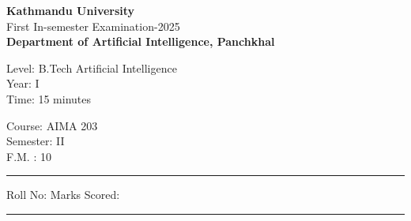 \documentclass[12pt]{exam}
\begin{document}
\begin{center}
  {\bfseries  {\large Kathmandu University}} \\
  First In-semester Examination-2025 \\[-2mm]
    \textbf{\small Department of Artificial Intelligence, Panchkhal}
\end{center}
\vspace{2mm}

\begin{minipage}{0.70\linewidth}
  \begin{flushleft}
    Level: B.Tech Artificial Intelligence \\
    Year: I \\
    Time: 15 minutes
  \end{flushleft}
\end{minipage} \hfill
\begin{minipage}{0.25\linewidth}
  \begin{flushleft}
    Course: AIMA 203 \\
    Semester: II \\
    F.M. : 10
  \end{flushleft}
\end{minipage}
\vspace{-8mm}
\begin{center}
  \rule{\textwidth}{1pt}
  Roll No: \hspace{5.5cm} Marks Scored:
  \vskip -3mm
\rule{\textwidth}{1pt}
\end{center}
\end{document}
